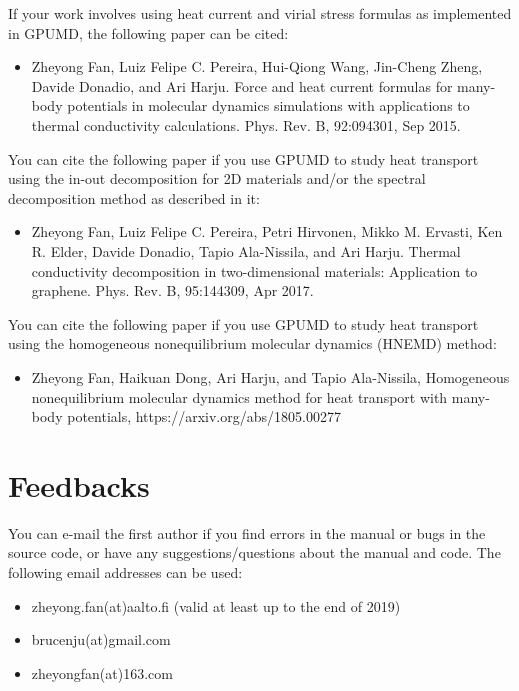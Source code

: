 \documentclass[12pt,a4paper]{report}
\begin{document}
If your work involves using heat current and virial stress formulas as implemented in GPUMD, the following paper can be cited:
\begin{itemize}
\item Zheyong Fan, Luiz Felipe C. Pereira, Hui-Qiong Wang, Jin-Cheng Zheng, Davide Donadio, and Ari Harju. Force and heat current formulas for many-body
potentials in molecular dynamics simulations with applications to thermal conductivity calculations. Phys. Rev. B, 92:094301, Sep 2015.
\end{itemize}

You can cite the following paper if you use GPUMD to study heat transport using the in-out decomposition for 2D materials and/or the spectral decomposition method as described in it:
\begin{itemize}
\item Zheyong Fan, Luiz Felipe C. Pereira, Petri Hirvonen, Mikko M. Ervasti, Ken R.
Elder, Davide Donadio, Tapio Ala-Nissila, and Ari Harju. Thermal conductivity
decomposition in two-dimensional materials: Application to graphene. Phys.
Rev. B, 95:144309, Apr 2017.
\end{itemize}


You can cite the following paper if you use GPUMD to study heat transport using the homogeneous nonequilibrium molecular dynamics (HNEMD) method:
\begin{itemize}
\item 
Zheyong Fan, Haikuan Dong, Ari Harju, and Tapio Ala-Nissila,
Homogeneous nonequilibrium molecular dynamics method for heat transport with many-body potentials,
https://arxiv.org/abs/1805.00277
\end{itemize}


\section{Feedbacks}

You can e-mail the first author if you find errors in the manual or bugs in the source code, or have any suggestions/questions about the manual and code. The following email addresses can be used:
\begin{itemize}
\item zheyong.fan(at)aalto.fi (valid at least up to the end of 2019)
\item brucenju(at)gmail.com
\item zheyongfan(at)163.com
\end{itemize}
\end{document}
